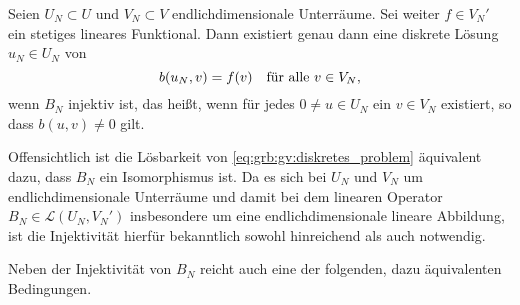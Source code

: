 \begin{Satz}
\label{satz:grb:gv:existenz_eindeutigkeit_der_disrekten_loesung}
    Seien $U_{N} \subset U$ und $V_{N} \subset V$ endlichdimensionale Unterräume.
    Sei weiter $f \in V_{N}'$ ein stetiges lineares Funktional.
    Dann existiert genau dann eine diskrete Lösung $u_{N} \in U_{N}$ von
    \begin{equation}
    \label{eq:grb:gv:diskretes_problem}
        b(u_{N}, v) = f(v) \quad \fa v \in V_{N},
    \end{equation}
    wenn $B_{N}$ injektiv ist, das heißt, wenn für jedes $0 \neq u \in U_{N}$ ein $v \in V_{N}$ existiert, so dass $b(u, v) \neq 0$ gilt.

    \begin{Beweis}
        Offensichtlich ist die Lösbarkeit von \cref{eq:grb:gv:diskretes_problem} äquivalent dazu, dass $B_{N}$ ein Isomorphismus ist.
        Da es sich bei $U_{N}$ und $V_{N}$ um endlichdimensionale Unterräume und damit bei dem linearen Operator $B_{N} \in \mathcal L(U_{N}, V_{N}')$ insbesondere um eine endlichdimensionale lineare Abbildung, ist die Injektivität hierfür bekanntlich sowohl hinreichend als auch notwendig.
    \end{Beweis}
\end{Satz}

Neben der Injektivität von $B_{N}$ reicht auch eine der folgenden, dazu äquivalenten Bedingungen.

